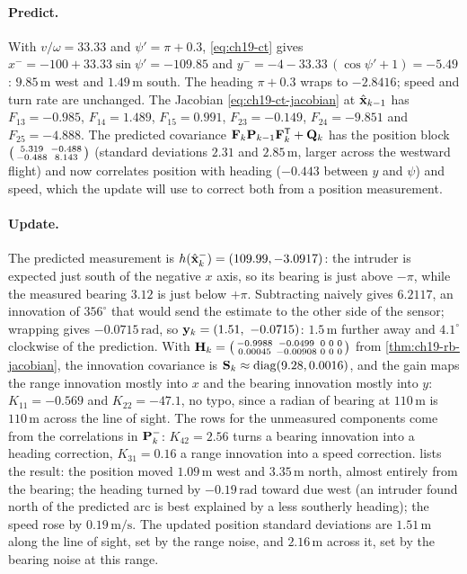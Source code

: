 \paragraph{Predict.}
With $v/\omega = 33.33$ and $\psi' = \pi + 0.3$, \cref{eq:ch19-ct} gives
$x^- = -100 + 33.33\sin\psi' = -109.85$ and $y^- = -4 - 33.33\,(\cos\psi' + 1)
= -5.49$: $9.85\,\mathrm{m}$ west and $1.49\,\mathrm{m}$ south. The heading
$\pi + 0.3$ wraps to $-2.8416$; speed and turn rate are unchanged. The
Jacobian \cref{eq:ch19-ct-jacobian} at $\hat{\mathbf{x}}_{k-1}$ has $F_{13} =
-0.985$, $F_{14} = 1.489$, $F_{15} = 0.991$, $F_{23} = -0.149$, $F_{24} =
-9.851$ and $F_{25} = -4.888$. The predicted covariance $\mathbf{F}_k\mathbf{P}_{k-1}\mathbf{F}_k^{\mathsf{T}} +
\mathbf{Q}_k$ has the position block $\begin{psmallmatrix} 5.319 & -0.488\\
-0.488 & 8.143\end{psmallmatrix}$ (standard deviations $2.31$ and
$2.85\,\mathrm{m}$, larger across the westward flight) and now correlates
position with heading ($-0.443$ between $y$ and $\psi$) and speed, which the
update will use to correct both from a position measurement.

\paragraph{Update.}
The predicted measurement is $h(\hat{\mathbf{x}}_k^-) = (109.99, -3.0917)$: the
intruder is expected just south of the negative $x$ axis, so its bearing is
just above $-\pi$, while the measured bearing $3.12$ is just below $+\pi$.
Subtracting naively gives $6.2117$, an innovation of $356^\circ$ that would
send the estimate to the other side of the sensor; wrapping gives
$-0.0715\,\mathrm{rad}$, so $\mathbf{y}_k = (1.51,\ -0.0715)$: $1.5\,\mathrm{m}$
further away and $4.1^\circ$ clockwise of the prediction. With
$\mathbf{H}_k = \begin{psmallmatrix} -0.9988 & -0.0499 & 0 & 0 & 0\\
0.00045 & -0.00908 & 0 & 0 & 0\end{psmallmatrix}$ from
\cref{thm:ch19-rb-jacobian}, the innovation covariance
is $\mathbf{S}_k \approx \operatorname{diag}(9.28, 0.0016)$, and the gain maps the range
innovation mostly into $x$ and the bearing innovation mostly into $y$:
$K_{11} = -0.569$ and $K_{22} = -47.1$, no typo, since a radian of bearing
at $110\,\mathrm{m}$ is $110\,\mathrm{m}$ across the line of sight. The rows
for the unmeasured components come from the correlations in $\mathbf{P}_k^-$:
$K_{42} = 2.56$ turns a bearing innovation into a heading correction,
$K_{31} = 0.16$ a range innovation into a speed correction.
 lists the result: the position moved
$1.09\,\mathrm{m}$ west and $3.35\,\mathrm{m}$ north, almost entirely from
the bearing; the heading turned by $-0.19\,\mathrm{rad}$ toward due west
(an intruder found north of the predicted arc is best explained by a less
southerly heading); the speed rose by $0.19\,\mathrm{m/s}$. The updated
position standard deviations are $1.51\,\mathrm{m}$ along the line of sight,
set by the range noise, and $2.16\,\mathrm{m}$ across it, set by the bearing
noise at this range.

